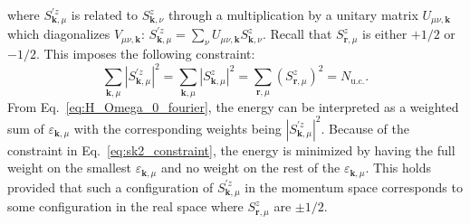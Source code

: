 \documentclass[twocolumn,superscriptaddress,amsmath,amssymb,aps,prx,nofootinbib]{revtex4-2}
\begin{document}
where $S^{'z}_{\mathbf{k},\mu}$ is related to $S^z_{\mathbf{k},\nu}$ through a multiplication by a unitary matrix $U_{\mu\nu,\mathbf{k}}$ which diagonalizes $V_{\mu\nu,\mathbf{k}}$: $S^{'z}_{\mathbf{k},\mu} = \sum_\nu U_{\mu\nu,\mathbf{k}} S^z_{\mathbf{k},\nu}$.
Recall that $S^z_{\mathbf{r},\mu}$ is either $+1/2$ or $-1/2$. This imposes the following constraint:
\begin{equation} \label{eq:sk2_constraint}
  \sum_{\mathbf{k},\mu} | S^{'z}_{\mathbf{k},\mu} |^2 = \sum_{\mathbf{k},\mu } |S^z_{\mathbf{k},\mu} |^2 =  \sum_{\mathbf{r},\mu} \left(  S^z_{\mathbf{r},\mu} \right)^2 = N_{\text{u.c.}} .
\end{equation}
From Eq.~\eqref{eq:H_Omega_0_fourier}, the energy can be interpreted as a weighted sum of $\varepsilon_{\mathbf{k},\mu}$ with the corresponding weights being $|S^{'z}_{\mathbf{k},\mu}|^2$. Because of the constraint in Eq.~\eqref{eq:sk2_constraint}, the energy is minimized by having the full weight on the smallest $\varepsilon_{\mathbf{k},\mu}$ and no weight on the rest of the $\varepsilon_{\mathbf{k},\mu}$. This holds provided that such a configuration of $S^{'z}_{\mathbf{k},\mu}$ in the momentum space corresponds to some configuration in the real space where $S^z_{\mathbf{r},\mu}$ are $\pm 1/2$.
\end{document}
